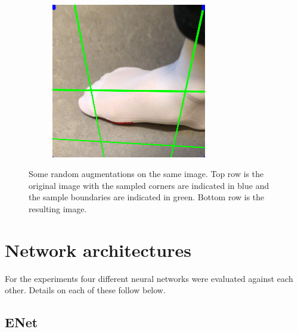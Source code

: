 \documentclass{kththesis}
\begin{document}
\begin{figure}[h]
\begin{subfigure}[b]{0.3\textwidth}
      \end{subfigure}
    ~
    \begin{subfigure}[b]{0.3\textwidth}
        \includegraphics[width=\textwidth]{augmented3}
      \end{subfigure}
      \caption{Some random augmentations on the same image. Top row is the
        original image with the sampled corners are indicated in blue and
        the sample boundaries are indicated in green. Bottom row is the
        resulting image.}\label{fig:augment}
\end{figure}


\section{Network architectures}
For the experiments four different neural networks were evaluated against each
other. Details on each of these follow below. 

\subsection{ENet}
\end{document}
